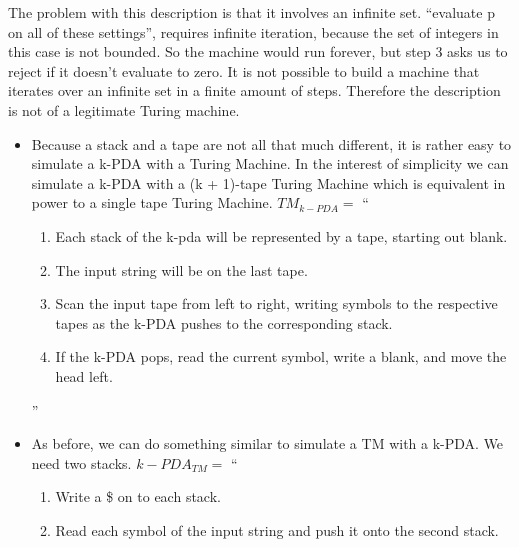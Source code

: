 \begin{problem}{4}
  \begin{solution}
    The problem with this description is that it involves an infinite set. ``evaluate p on all of these settings'',
    requires infinite iteration, because the set of integers in this case is not bounded. So the machine would run
    forever, but step 3 asks us to reject if it doesn't evaluate to zero. It is not possible to build a machine that
    iterates over an infinite set in a finite amount of steps.  Therefore the description is not of a legitimate Turing
    machine.
  \end{solution}
\end{problem}

\begin{problem}{5}
  \begin{solution}
    \begin{itemize}
      \item Because a stack and a tape are not all that much different, it is rather easy to simulate a k-PDA with a
      Turing Machine.  In the interest of simplicity we can simulate a k-PDA with a (k + 1)-tape Turing Machine which is
      equivalent in power to a single tape Turing Machine.
      $TM_{k-PDA} = $ ``
      \begin{enumerate}
        \item Each stack of the k-pda will be represented by a tape, starting out blank. \\
        \item The input string will be on the last tape. \\
        \item Scan the input tape from left to right, writing symbols to the respective tapes as the k-PDA pushes to the corresponding stack. \\
        \item If the k-PDA pops, read the current symbol, write a blank, and move the head left.
      \end{enumerate}
      '' \\
      \item As before, we can do something similar to simulate a TM with a k-PDA. We need two stacks.
      $k-PDA_{TM} =$ ``
        \begin{enumerate}
          \item Write a \$ on to each stack. \\
          \item Read each symbol of the input string and push it onto the second stack. \\

\end{enumerate}
\end{itemize}
\end{solution}
\end{problem}
